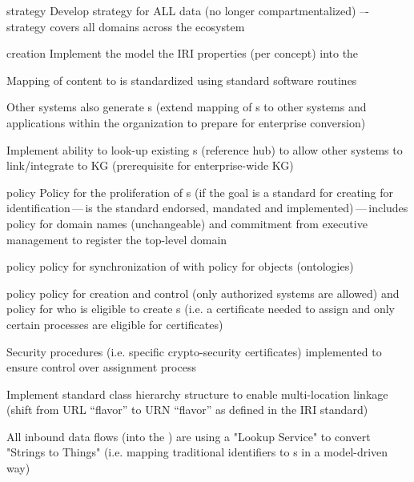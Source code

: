 \kgmmscoringlevelTwo

\begin{scoring}

  \item [strategy] Develop strategy for ALL data (no longer compartmentalized) –- strategy covers all domains across
        the ecosystem
  \item [creation] Implement the model the IRI properties (per concept) into the 
  \item Mapping of content to  is standardized using standard software routines
  \item Other systems also generate s (extend mapping of s to other systems and
        applications within the organization to prepare for enterprise conversion)
  \item Implement ability to look-up existing s (reference hub) to allow other systems to
        link/integrate to KG (prerequisite for enterprise-wide KG)
  \item [policy] Policy for the proliferation of s (if the goal is a standard for creating for
        identification\,---\,is the standard endorsed, mandated and implemented)\,---\,includes policy
        for domain names (unchangeable) and commitment from executive management to register the top-level domain
  \item [policy] policy for synchronization of  with policy for objects (ontologies)
  \item [policy] policy for creation and control (only authorized systems are allowed) and policy for who is
        eligible to create s (i.e. a certificate needed to assign and only certain processes are
        eligible for certificates)

\end{scoring}

\kgmmscoringlevelThree

\begin{scoring}

  \item Security procedures (i.e. specific crypto-security certificates) implemented to ensure control over
         assignment process
  \item Implement standard  class hierarchy structure to enable multi-location linkage (shift from
        URL “flavor” to URN “flavor” as defined in the IRI standard)
  \item All inbound data flows (into the ) are using a "Lookup Service" to convert "Strings to Things"
        (i.e. mapping traditional identifiers to s in a model-driven way)

\end{scoring}
